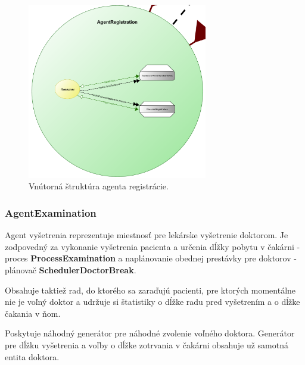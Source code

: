 \documentclass[letterpaper]{article}
\begin{document}
	\begin{figure}[hbt!]
		\centering
		\includegraphics[width=0.7\textwidth]{src/AgentRegistration}
		\caption{Vnútorná štruktúra agenta registrácie.}
	\end{figure}
	
	\newpage
	
	\subsubsection{AgentExamination}
	
	Agent vyšetrenia reprezentuje miestnosť pre lekárske vyšetrenie doktorom. Je zodpovedný za vykonanie vyšetrenia pacienta a určenia dĺžky pobytu v čakárni - proces \textbf{ProcessExamination} a naplánovanie obednej prestávky pre doktorov - plánovač \textbf{SchedulerDoctorBreak}. 
	
	Obsahuje taktiež rad, do ktorého sa zaraďujú pacienti, pre ktorých momentálne nie je voľný doktor a udržuje si štatistiky o dĺžke radu pred vyšetrením a o dĺžke čakania v ňom.
	
	Poskytuje náhodný generátor pre náhodné zvolenie voľného doktora. Generátor pre dĺžku vyšetrenia a voľby o dĺžke zotrvania v čakárni obsahuje už samotná entita doktora.
	
	\vspace{0.8cm}
	
\end{document}

